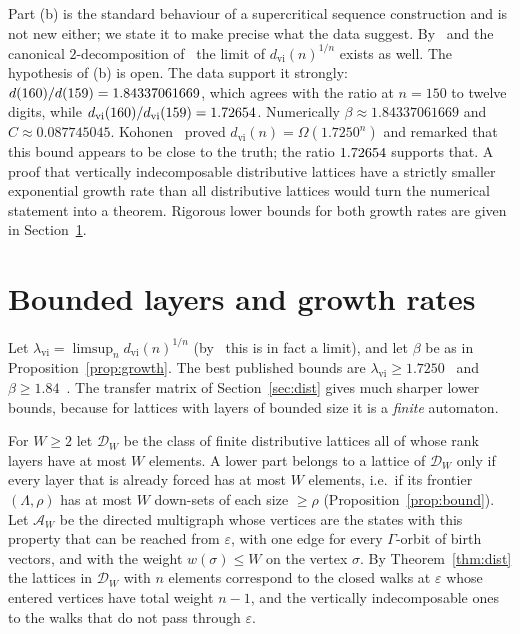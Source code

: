 \documentclass[11pt]{amsart}
\theoremstyle{definition}
\theoremstyle{remark}
\begin{document}
Part (b) is the standard behaviour of a supercritical sequence construction and is not
new either; we state it to make precise what the data suggest.  By~\cite[Corollary~11]{EHR}
and the canonical $2$-decomposition of~\cite{EHR} the limit of $d_{\mathrm{vi}}(n)^{1/n}$
exists as well.  The hypothesis of (b) is open.  The data support it strongly:
$d(160)/d(159) = 1.84337061669$, which agrees with the ratio at $n=150$ to twelve
digits, while $d_{\mathrm{vi}}(160)/d_{\mathrm{vi}}(159) = 1.72654$.
Numerically $\beta \approx 1.84337061669$ and $C \approx 0.087745045$.
Kohonen~\cite{Koh21} proved $d_{\mathrm{vi}}(n) = \Omega(1.7250^n)$ and remarked that
this bound appears to be close to the truth; the ratio $1.72654$ supports that.  A
proof that vertically indecomposable distributive lattices have a strictly smaller
exponential growth rate than all distributive lattices would turn the numerical
statement into a theorem.  Rigorous lower bounds for both growth rates are given in
Section~\ref{sec:bounded}.

\section{Bounded layers and growth rates}\label{sec:bounded}

Let $\lambda_{\mathrm{vi}} = \limsup_n d_{\mathrm{vi}}(n)^{1/n}$ (by~\cite[Corollaries~7 and~11]{EHR}
this is in fact a limit), and let
$\beta$ be as in Proposition~\ref{prop:growth}.  The best published bounds are
$\lambda_{\mathrm{vi}} \ge 1.7250$~\cite{Koh21} and $\beta \ge 1.84$~\cite{EHR}.  The transfer
matrix of Section~\ref{sec:dist} gives much sharper lower bounds, because for lattices with
layers of bounded size it is a \emph{finite} automaton.

For $W \ge 2$ let $\mathcal{D}_W$ be the class of finite distributive lattices all of whose
rank layers have at most $W$ elements.  A lower part belongs to a lattice of $\mathcal{D}_W$
only if every layer that is already forced has at most $W$ elements, i.e.\ if its
frontier $(\Lambda,\rho)$ has at most $W$ down-sets of each size $\ge \rho$
(Proposition~\ref{prop:bound}).  Let $\mathcal{A}_W$ be the directed multigraph whose
vertices are the states with this property that can be reached from $\varepsilon$, with one
edge for every $\Gamma$-orbit of birth vectors, and with the weight $w(\sigma) \le W$ on the
vertex $\sigma$.  By Theorem~\ref{thm:dist} the lattices in $\mathcal{D}_W$ with $n$ elements
correspond to the closed walks at $\varepsilon$ whose entered vertices have total weight $n-1$,
and the vertically indecomposable ones to the walks that do not pass through $\varepsilon$.
\end{document}
